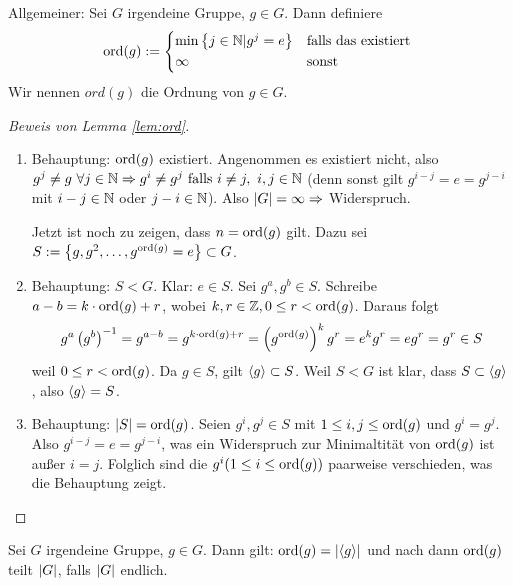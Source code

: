 \documentclass[12pt,a4paper]{scrartcl}
\begin{document}
\begin{defi}
	Allgemeiner: Sei $G$ irgendeine Gruppe, $g \in G$. Dann definiere \begin{equation*}
		\ord(g) := \begin{cases*}
		\min \left\lbrace j \in \IN | g^j = e\right\rbrace &falls das existiert \\
		\infty &sonst
		\end{cases*}
	\end{equation*}
	Wir nennen $ord(g)$ die Ordnung von $g \in G$.
\end{defi}

\begin{proof} [Beweis von Lemma \ref{lem:ord}]
	\begin{enumerate}
	\item Behauptung: $\operatorname{ord}(g)$ existiert. Angenommen es existiert nicht, also 
	$
		g^j \not = g ~ \forall j \in \mathbb N \Rightarrow g^i \neq g^j \text{ falls } i \neq j, ~ i,j \in \mathbb N 
	$
	(denn sonst gilt $g^{i-j}=e=g^{j-i}$ mit $i-j \in \mathbb N$ oder $j-i \in \mathbb N$).
	Also $\lvert G\rvert = \infty \Rightarrow$ Widerspruch.
	
	Jetzt ist noch zu zeigen, dass $n = \operatorname{ord}(g)$ gilt. Dazu sei $S := \left\lbrace g, g^2, \ldots, g^{\operatorname{ord}(g)} = e \right\rbrace \subset G$.
	
	\item Behauptung: $S < G$. Klar: $e \in S$. Sei $g^a, g^b \in S$. Schreibe $a-b = k \cdot \operatorname{ord}(g) + r$, wobei $k, r \in \mathbb Z, 0 \leq r < \operatorname{ord}(g)$. Daraus folgt
	\begin{equation*}
		g^a\left( g^b \right)^{-1}=g^{a-b}=g^{k \cdot \operatorname{ord}(g)+r}
		= \left(g^{\operatorname{ord}(g)} \right)^kg^r = e^kg^r=eg^r=g^r \in S
	\end{equation*}
	weil $0 \leq r < \operatorname{ord}(g)$.
	Da $g \in S$, gilt $\langle g\rangle\subset S$. Weil $S < G$ ist klar, dass $S \subset \langle g\rangle$, also $\langle g\rangle = S$.
	\item Behauptung: $\lvert S\rvert = \operatorname{ord}(g)$. Seien $g^i, g^j \in S$ mit $1 \leq i,j \leq \operatorname{ord}(g)$ und $g^i=g^j$. Also $g^{i-j} = e = g^{j-i}$, was ein Widerspruch zur Minimaltität von $\operatorname{ord}(g)$ ist außer $i=j$. Folglich sind die $g^i (1\leq i \leq \operatorname{ord}(g))$ paarweise verschieden, was die Behauptung zeigt.
	\end{enumerate}
\end{proof}

\begin{bem}
	Sei $G$ irgendeine Gruppe, $g\in G$. Dann gilt: $\operatorname{ord}(g) = \lvert\langle g\rangle\rvert$ und nach  dann $\operatorname{ord}(g)$ teilt $\lvert G\rvert$, falls $\lvert G\rvert$ endlich.
\end{bem}
\end{document}
